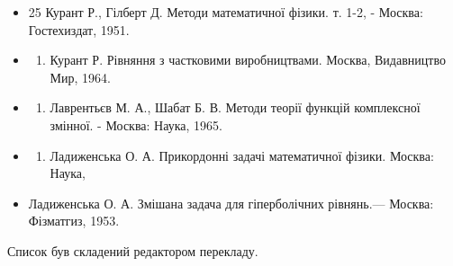 \documentclass[
]{article}
\providecommand{\tightlist}{%
  \setlength{\itemsep}{0pt}\setlength{\parskip}{0pt}}
\begin{document}
{{{{\begin{itemize}
\begin{enumerate}
    Наука, 1978.
  \end{enumerate}
\item
  25 Курант Р., Гілберт Д. Методи математичної фізики. т. 1-2, - Москва:
  Гостехиздат, 1951.
\item
  \begin{enumerate}
  \def\labelenumi{\arabic{enumi}.}
  \setcounter{enumi}{26}
  \tightlist
  \item
    Курант Р. Рівняння з частковими виробництвами. Москва, Видавництво
    Мир, 1964.
  \end{enumerate}
\item
  \begin{enumerate}
  \def\labelenumi{\arabic{enumi}.}
  \setcounter{enumi}{27}
  \tightlist
  \item
    Лаврентьєв М. А., Шабат Б. В. Методи теорії функцій комплексної
    змінної. - Москва: Наука, 1965.
  \end{enumerate}
\item
  \begin{enumerate}
  \def\labelenumi{\arabic{enumi}.}
  \setcounter{enumi}{28}
  \tightlist
  \item
    Ладиженська О. А. Прикордонні задачі математичної фізики. Москва:
    Наука,
  \end{enumerate}
\item
  Ладиженська О. А. Змішана задача для гіперболічних рівнянь.--- Москва:
  Фізматгиз, 1953.
\end{itemize}

Список був складений редактором перекладу.

}}}}
\end{document}
